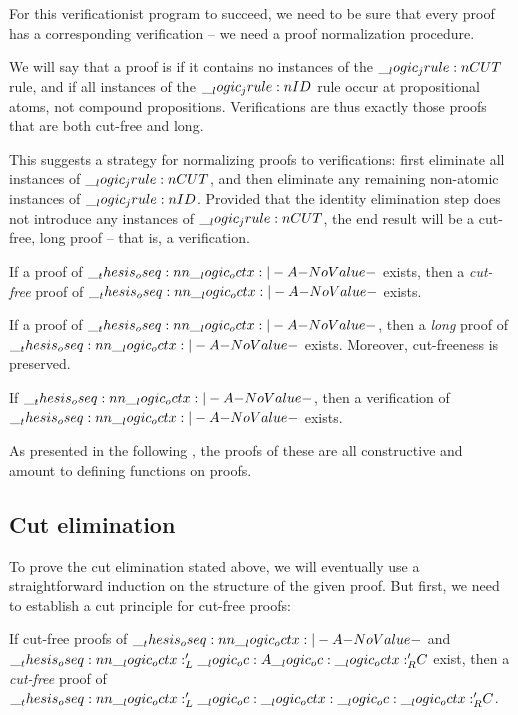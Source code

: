 For this verificationist program to succeed, we need to be sure that every proof has a corresponding verification -- we need a proof normalization procedure.

We will say that a proof is  if it contains no instances of the $\__logic_jrule:n {CUT}$ rule, and  if all instances of the $\__logic_jrule:n {ID}$ rule occur at propositional atoms, not compound propositions.
Verifications are thus exactly those proofs that are both cut-free and long.

This suggests a strategy for normalizing proofs to verifications: first eliminate all instances of $\__logic_jrule:n {CUT}$, and then eliminate any remaining non-atomic instances of $\__logic_jrule:n {ID}$.
Provided that the identity elimination step does not introduce any instances of $\__logic_jrule:n {CUT}$, the end result will be a cut-free, long proof -- that is, a verification.

\begin{theorem}[name=Cut elimination, restate=orderedcutelimination]\label{thm*:ordered-logic:cut-elimination}
  If a proof of\/ $\oseq{\octx |- A}$ exists, then a \emph{cut-free} proof of $\oseq{\octx |- A}$ exists.
\end{theorem}

\begin{restatable}
  If a proof of\/ $\oseq{\octx |- A}$, then a \emph{long} proof of\/ $\oseq{\octx |- A}$ exists.
  Moreover, cut-freeness is preserved.
\end{restatable}

\begin{corollary*}
  If\/ $\oseq{\octx |- A}$, then a verification of\/ $\oseq{\octx |- A}$ exists.
\end{corollary*}

As presented in the following , the proofs of these  are all constructive and amount to defining functions on proofs.

\subsection{Cut elimination}\label{sec:ordered-logic:cut-elimination}

To prove the cut elimination  stated above, we will eventually use a straightforward induction on the structure of the given proof.
But first, we need to establish a cut principle for cut-free proofs:
%
\begin{lemma*}\label{lem*:ordered-logic:cut-admissibility}
  If cut-free proofs of\/ $\oseq{\octx |- A}$ and $\oseq{\octx'_L \oc A \oc \octx'_R |- C}$ exist, then a \emph{cut-free} proof of\/ $\oseq{\octx'_L \oc \octx \oc \octx'_R |- C}$.
\end{lemma*}

